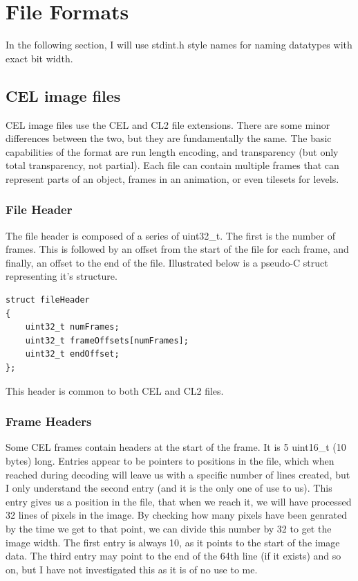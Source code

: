 \documentclass[a4paper]{article}
\begin{document}
\section{File Formats}
In the following section, I will use stdint.h style names for naming datatypes with exact bit width.

\subsection{CEL image files}
	CEL image files use the CEL and CL2 file extensions. There are some minor differences between the two, but they are fundamentally the same. The basic capabilities of the format are run length encoding, and transparency (but only total transparency, not partial). Each file can contain multiple frames that can represent parts of an object, frames in an animation, or even tilesets for levels.

	\subsubsection{File Header}
	\label{sec:fileheaders}
	The file header is composed of a series of uint32\_t. The first is the number of frames. This is followed by an offset from the start of the file for each frame, and finally, an offset to the end of the file. Illustrated below is a pseudo-C struct representing it's structure.
	\begin{lstlisting}
struct fileHeader
{
	uint32_t numFrames;
	uint32_t frameOffsets[numFrames];
	uint32_t endOffset;
};
	\end{lstlisting}
	 This header is common to both CEL and CL2 files.
	 
	\subsubsection{Frame Headers}
	\label{sec:frameheaders}
	Some CEL frames contain headers at the start of the frame. It is 5 uint16\_t (10 bytes) long. Entries appear to be pointers to positions in the file, which when reached during decoding will leave us with a specific number of lines created, but I only understand the second entry (and it is the only one of use to us). This entry gives us a position in the file, that when we reach it, we will have processed 32 lines of pixels in the image. By checking how many pixels have been genrated by the time we get to that point, we can divide this number by 32 to get the image width.
	The first entry is always 10, as it points to the start of the image data.
	The third entry may point to the end of the 64th line (if it exists) and so on, but I have not investigated this as it is of no use to me.
	
\end{document}
